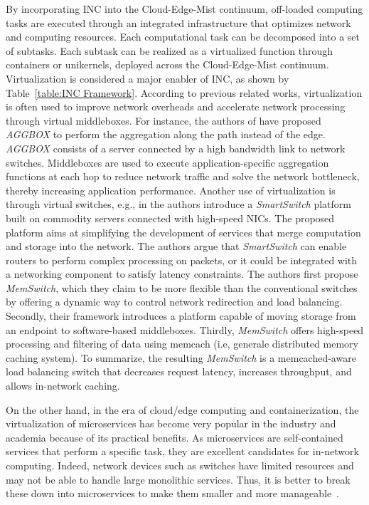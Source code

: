\noindent By incorporating INC into the Cloud-Edge-Mist continuum, off-loaded computing tasks are executed through an integrated infrastructure that optimizes network and computing resources. Each computational task can be decomposed into a set of subtasks. Each subtask can be realized as a virtualized function through containers or unikernels, deployed across the Cloud-Edge-Mist continuum. Virtualization is considered a major enabler of INC, as shown by Table~\ref{table:INC Framework}. According to previous related works, virtualization is often used to improve network overheads and accelerate network processing through virtual middleboxes. For instance, the authors of \cite{mai2014netagg} have proposed \textit{AGGBOX} to perform the aggregation along the path instead of the edge. \textit{AGGBOX} consists of a server connected by a high bandwidth link to network switches. Middleboxes are used to execute application-specific aggregation functions at each hop to reduce network traffic and solve the network bottleneck, thereby increasing application performance. 
Another use of virtualization is through virtual switches, e.g., in \cite{zhang2014smartswitch} the authors introduce a \textit{SmartSwitch} platform built on commodity servers connected with high-speed NICs. The proposed platform aims at simplifying the development of services that merge computation and storage into the network. The authors argue that \textit{SmartSwitch} can enable routers to perform complex processing on packets, or it could be integrated with a networking component to satisfy latency constraints. The authors first propose \textit{MemSwitch}, which they claim to be more flexible than the conventional switches by offering a dynamic way to control network redirection and load balancing. Secondly, their framework introduces a platform capable of moving storage from an endpoint to software-based middleboxes. Thirdly, \textit{MemSwitch} offers high-speed processing and filtering of data using memcach (i.e, generale distributed memory caching system). To summarize, the resulting \textit{MemSwitch} is a memcached-aware load balancing switch that decreases request latency, increases throughput, and allows in-network caching. 

On the other hand, in the era of cloud/edge computing and containerization, the virtualization of microservices has become very popular in the industry and academia because of its practical benefits. As microservices are self-contained services that perform a specific task, they are excellent candidates for in-network computing. Indeed, network devices such as switches have limited resources and may not be able to handle large monolithic services. Thus, it is better to break these down into microservices to make them smaller and more manageable~\cite{ENTICE}. 

